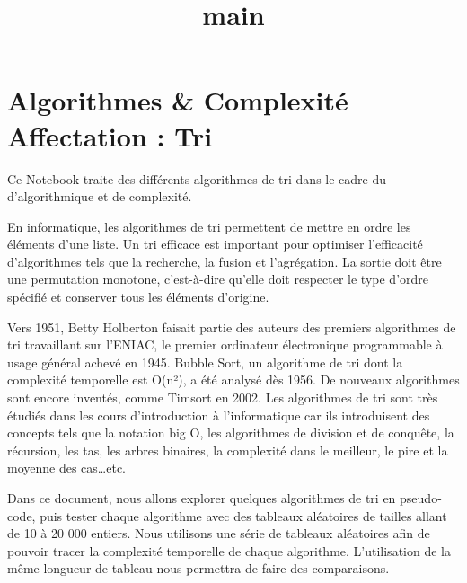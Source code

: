\documentclass[11pt]{article}
\title{main}
\begin{document}
    
    \maketitle
    
    

    
    \hypertarget{algorithmes-complexituxe9-affectation-tri}{%
\section{Algorithmes \& Complexité Affectation :
Tri}\label{algorithmes-complexituxe9-affectation-tri}}

Ce Notebook traite des différents algorithmes de tri dans le cadre du
d'algorithmique et de complexité.

En informatique, les algorithmes de tri permettent de mettre en ordre
les éléments d'une liste. Un tri efficace est important pour optimiser
l'efficacité d'algorithmes tels que la recherche, la fusion et
l'agrégation. La sortie doit être une permutation monotone, c'est-à-dire
qu'elle doit respecter le type d'ordre spécifié et conserver tous les
éléments d'origine.

Vers 1951, Betty Holberton faisait partie des auteurs des premiers
algorithmes de tri travaillant sur l'ENIAC, le premier ordinateur
électronique programmable à usage général achevé en 1945. Bubble Sort,
un algorithme de tri dont la complexité temporelle est O(n²), a été
analysé dès 1956. De nouveaux algorithmes sont encore inventés, comme
Timsort en 2002. Les algorithmes de tri sont très étudiés dans les cours
d'introduction à l'informatique car ils introduisent des concepts tels
que la notation big O, les algorithmes de division et de conquête, la
récursion, les tas, les arbres binaires, la complexité dans le meilleur,
le pire et la moyenne des cas\ldots etc.

Dans ce document, nous allons explorer quelques algorithmes de tri en
pseudo-code, puis tester chaque algorithme avec des tableaux aléatoires
de tailles allant de 10 à 20 000 entiers. Nous utilisons une série de
tableaux aléatoires afin de pouvoir tracer la complexité temporelle de
chaque algorithme. L'utilisation de la même longueur de tableau nous
permettra de faire des comparaisons.
\end{document}
